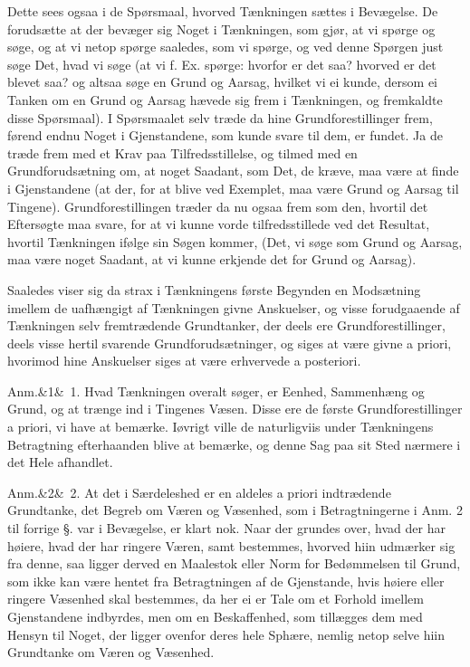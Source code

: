 \documentclass[12pt]{book}
\def\sperr#1{#1}%
\def\textit#1{#1}%
\def\emph#1{#1}%
\newcommand{\sperr}[1]{\textls[180]{#1}}
\newcommand{\anm}[1]{%
  \par\vspace{0.5\baselineskip}%
  \noindent\hspace{\parindent}\sperr{Anm.}\ifx&#1&\else~\textit{#1}.\fi
  \enspace\ignorespaces
}
\newcommand{\opage}[1]{\marginnote{\footnotesize\textit{[#1]}}}
\begin{document}
Dette sees ogsaa i de Spørsmaal, hvorved Tænkningen sættes i Bevægelse. De
forudsætte at der bevæger sig Noget i Tænkningen, som gjør, at vi spørge og
søge, og at vi netop spørge saaledes, som vi spørge, og ved denne Spørgen just
søge Det, hvad vi søge (at vi f. Ex. spørge: hvorfor er det saa? hvorved er det
blevet saa? og altsaa søge en Grund og Aarsag, hvilket vi ei kunde, dersom ei
Tanken om en Grund og Aarsag hævede sig frem i Tænkningen, og fremkaldte disse
Spørsmaal). I Spørsmaalet selv træde da hine Grundforestillinger frem, førend
endnu Noget i Gjenstandene, som kunde svare til dem, er fundet. Ja de træde
frem med et Krav paa Tilfredsstillelse, og tilmed
\opage{22} med en Grundforudsætning om, at noget Saadant, som Det, de kræve, maa være at
finde i Gjenstandene (at der, for at blive ved Exemplet, maa være Grund og
Aarsag til Tingene). Grundforestillingen træder da nu ogsaa frem som den,
hvortil det Eftersøgte maa svare, for at vi kunne vorde tilfredsstillede ved
det Resultat, hvortil Tænkningen ifølge sin Søgen kommer, (Det, vi søge som
Grund og Aarsag, maa være noget Saadant, at vi kunne erkjende det for Grund og
Aarsag).

Saaledes viser sig da strax i Tænkningens første Begynden en Modsætning imellem
de uafhængigt af Tænkningen givne Anskuelser, og visse forudgaaende af
Tænkningen selv fremtrædende Grundtanker, der deels ere Grundforestillinger,
deels visse hertil svarende Grundforudsætninger, og siges at være givne
\textit{a priori}, hvorimod hine Anskuelser siges at være erhvervede
\textit{a posteriori}.

\anm{1} Hvad Tænkningen overalt søger, er \emph{Eenhed, Sammenhæng og Grund},
og at trænge ind i Tingenes Væsen. Disse ere de første Grundforestillinger
\textit{a priori}, vi have at bemærke. Iøvrigt ville de naturligviis under
Tænkningens Betragtning efterhaanden blive at bemærke, og denne Sag paa sit
Sted nærmere i det Hele afhandlet.

\anm{2} At det i Særdeleshed er en aldeles \textit{a priori} indtrædende
Grundtanke, det Begreb om Væren og Væsenhed, som i Betragtningerne i Anm. 2 til
forrige §. var i Bevægelse, er
\opage{23} klart nok. Naar der grundes over, hvad der har høiere, hvad der har ringere
Væren, samt bestemmes, hvorved hiin udmærker sig fra denne, saa ligger derved
en \emph{Maalestok eller Norm} for Bedømmelsen til Grund, som ikke kan være
hentet fra Betragtningen af de Gjenstande, hvis høiere eller ringere Væsenhed
skal bestemmes, da her ei er Tale om et Forhold imellem Gjenstandene indbyrdes,
men om en Beskaffenhed, som tillægges dem med Hensyn til Noget, der ligger
ovenfor deres hele Sphære, nemlig netop selve hiin Grundtanke om Væren og
Væsenhed.
\end{document}
